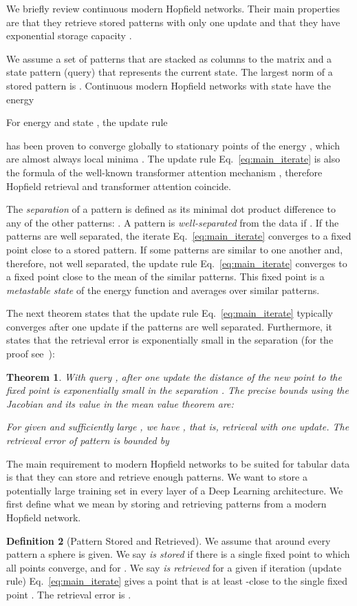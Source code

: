 \documentclass{article}
\theoremstyle{plain}
\newtheorem{theorem}{Theorem}[section]
\theoremstyle{definition}
\newtheorem{definition}[theorem]{Definition}
\theoremstyle{remark}
\begin{document}
We briefly review  
continuous modern Hopfield networks.
Their main properties are that they retrieve 
stored patterns with only one update 
and that they have exponential storage capacity
\citep{Ramsauer:21}.

We assume a set of patterns 
that are stacked as columns to 
the matrix  and a 
state pattern (query)  that represents the current state. 
The largest norm of a stored pattern is
.
Continuous modern Hopfield networks with state 
have the energy

For energy  and state , the update rule 

has been proven to converge globally  
to stationary points of the energy , which are almost always local minima 
\citep{Ramsauer:21}.
The update rule Eq.~\eqref{eq:main_iterate}
is also the formula of the well-known transformer attention mechanism
\citep{Vaswani:17,Ramsauer:21}, therefore Hopfield retrieval and
transformer attention coincide.

The {\em separation}   of a 
pattern  is defined as its minimal dot product difference to any of the other 
patterns:
. 
A pattern is {\em well-separated} from the data if .
If the patterns  are well separated, the iterate Eq.~\eqref{eq:main_iterate}
converges to a fixed point close to a stored pattern.
If some patterns are similar to one another and, therefore, not well separated, 
the update rule Eq.~\eqref{eq:main_iterate} converges to 
a fixed point close to the mean of the similar patterns. 
This fixed point is a {\em metastable state} of the energy function
and averages over similar patterns.

The next theorem states that the update rule Eq.~\eqref{eq:main_iterate} typically converges after
one update if the patterns are well separated. Furthermore, it states
that the retrieval error is 
exponentially small in the separation  (for the proof see~\mbox{\citep{Ramsauer:21}}):
\begin{theorem}
\label{th:oneUpdate}
With query , after one update the distance of the new point 
to the fixed point  is exponentially small in the separation .
The precise bounds using the Jacobian  and its value  in the mean value
theorem are:


For given  and 
sufficiently large , we have ,
that is, retrieval with one update.
The retrieval error  of pattern 
is bounded by

\end{theorem}

The main requirement to modern Hopfield networks to
be suited for tabular data is that they can store and retrieve enough patterns.
We want to store a potentially large training set in every layer
of a Deep Learning architecture.
We first define what we mean by storing and retrieving patterns
from a modern Hopfield network.
\begin{definition}[Pattern Stored and Retrieved]
We assume that around every pattern  a sphere  is given.
We say  {\em is stored} if there is a single fixed point  to
which all points  converge,
and   for .
We say  {\em is retrieved} for a given  if 
iteration (update rule) Eq.~\eqref{eq:main_iterate} gives
a point  that is at least 
-close to the single fixed point . 
The retrieval error is .
\end{definition}
\end{document}
